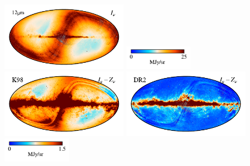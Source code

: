 \documentclass[twocolumn]{aa}
\begin{document}
\begin{figure}
    \includegraphics[height=2.90cm]{figs/compare_zsma/cosmoglobe_ma_05.pdf}%
    \includegraphics[width=2.90cm,angle=90]{figs/compare_zsma/cbar_tot_05.pdf}%
    \includegraphics[height=2.90cm]{figs/compare_zsma/dirbe_zsma_05.pdf}%
    \includegraphics[height=2.90cm]{figs/compare_zsma/cosmoglobe_zsma_05.pdf}%
    \includegraphics[width=2.90cm,angle=90]{figs/compare_zsma/cbar_05.pdf}%
      \\


\end{figure}
\end{document}
